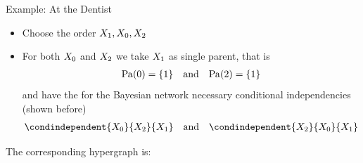 \documentclass{beamer}
\begin{document}
    \begin{frame}{Example: At the Dentist}

        \begin{itemize}
            \item Choose the order $X_{1},X_{0},X_{2}$
            \item For both $X_{0}$ and $X_{2}$ we take $X_{1}$ as single parent, that is
            \begin{align*}
                \mathrm{Pa}(0) = \{1\} \quad \text{and} \quad \mathrm{Pa}(2) = \{1\}
            \end{align*}
            and have the for the Bayesian network necessary conditional independencies (shown before)
            \begin{align*}
                \condindependent{\catvariableof{0}}{\catvariableof{2}}{\catvariableof{1}}
                \quad \text{and} \quad \condindependent{\catvariableof{2}}{\catvariableof{0}}{\catvariableof{1}}
            \end{align*}
        \end{itemize}
        The corresponding hypergraph is:
        

    \end{frame}
\end{document}
